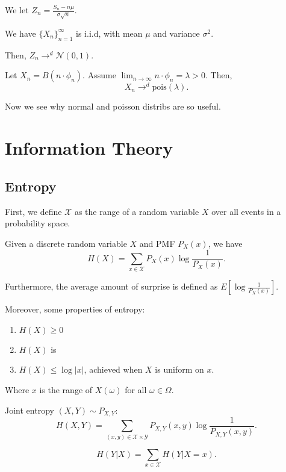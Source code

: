 \documentclass{article}
\begin{document}
We let $Z_n = \frac{S_n - n \mu}{\sigma \sqrt{n}}$.
\begin{theorem}
	We have $\{X_n\}_{n=1}^\infty$ is i.i.d, with mean $\mu$ and variance $\sigma^2$. 

	Then, $Z_n \to^d \mathcal{N}(0, 1)$.
\end{theorem}

\begin{theorem}
	Let $X_n = B(n \cdot \phi_n)$. Assume $\lim_{n \to \infty} n \cdot \phi_n = \lambda > 0$. Then, 
	\[X_n \to^d \mathrm{pois}(\lambda).\]
\end{theorem}

Now we see why normal and poisson distribs are so useful.
\newpage 
\section{Information Theory}
\subsection{Entropy}
First, we define $\mathcal{X}$ as the range of a random variable $X$ over all events in a probability space. 

\begin{definition}[Entropy] 
	Given a discrete random variable $X$ and PMF $P_X(x)$, we have 
	\[H(X) = \sum_{x \in \mathcal{X}} P_X(x) \log \frac{1}{P_X(x)}.\] 
\end{definition}

Furthermore, the average amount of surprise is defined as $E\left[\log \frac{1}{P_X(x)}\right]$.

Moreover, some properties of entropy: 
\begin{enumerate}
	\item $H(X) \geq 0$
	\item $H(X)$ is 
	\item $H(X) \leq \log |x|$, achieved when $X$ is uniform on $x$.
\end{enumerate}

Where $x$ is the range of $X(\omega)$ for all $\omega \in \Omega$.

\begin{definition}
	Joint entropy $(X, Y) \sim P_{X, Y}$:
	\[H(X, Y) = \sum_{(x, y) \in \mathcal{X} \times \mathcal{Y}} P_{X, Y} (x, y) \log \frac{1}{P_{X, Y}(x, y)}.\]
\end{definition}

\begin{definition} 
	\[H(Y | X) = \sum_{x \in \mathcal{X}} H(Y | X = x).\] 
\end{definition}
\end{document}
